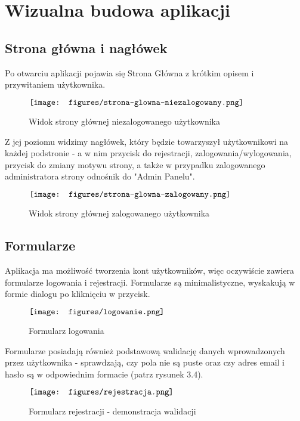 \documentclass[shortabstract,inz]{iithesis}
\begin{document}
\chapter{Wizualna budowa aplikacji}

\section{Strona główna i nagłówek}
Po otwarciu aplikacji pojawia się Strona Główna z krótkim opisem i przywitaniem użytkownika.

\begin{figure}[H]
	\centering
	$\vcenter{\hbox{\texttt{[image: figures/strona-glowna-niezalogowany.png]}}}$
    \caption[]{Widok strony głównej niezalogowanego użytkownika}
    \label{fig:strona-glowna}
\end{figure}

Z jej poziomu widzimy nagłówek, który będzie towarzyszył użytkownikowi na każdej podstronie - a w nim przycisk do rejestracji, zalogowania/wylogowania, przycisk do zmiany motywu strony, a także w przypadku zalogowanego administratora strony odnośnik do "Admin Panelu".

\begin{figure}[H]
	\centering
	$\vcenter{\hbox{\texttt{[image: figures/strona-glowna-zalogowany.png]}}}$
    \caption[]{Widok strony głównej zalogowanego użytkownika}
    \label{fig:strona-glowna-zalogowany}
\end{figure}

\section{Formularze}
Aplikacja ma możliwość tworzenia kont użytkowników, więc oczywiście zawiera formularze logowania i rejestracji. Formularze są minimalistyczne, wyskakują w formie dialogu po kliknięciu w przycisk.

\begin{figure}[H]
	\centering
	$\vcenter{\hbox{\texttt{[image: figures/logowanie.png]}}}$
    \caption[]{Formularz logowania}
    \label{fig:formularz-logowania}
\end{figure}

Formularze posiadają również podstawową walidację danych wprowadzonych przez użytkownika - sprawdzają, czy pola nie są puste oraz czy adres email i hasło są w odpowiednim formacie (patrz rysunek 3.4).

\begin{figure}[H]
	\centering
	$\vcenter{\hbox{\texttt{[image: figures/rejestracja.png]}}}$
    \caption[]{Formularz rejestracji - demonstracja walidacji}
    \label{fig:formularz-rejestracji}
\end{figure}
\end{document}
